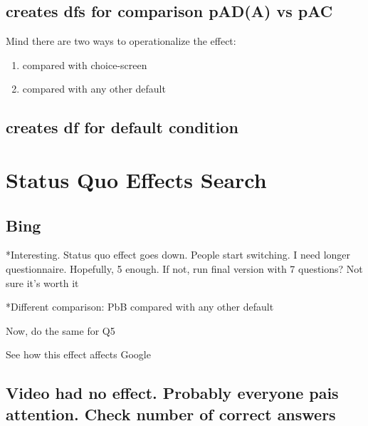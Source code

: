 \documentclass[
  11pt,
]{article}
\begin{document}
\hypertarget{creates-dfs-for-comparison-pada-vs-pac}{%
\subsection{creates dfs for comparison pA\textbar D(A) vs pA\textbar C}\label{creates-dfs-for-comparison-pada-vs-pac}}

Mind there are two ways to operationalize the effect:

\begin{enumerate}
\def\labelenumi{\arabic{enumi})}
\item
  compared with choice-screen
\item
  compared with any other default
\end{enumerate}

\hypertarget{creates-df-for-default-condition}{%
\subsection{creates df for default condition}\label{creates-df-for-default-condition}}

\hypertarget{status-quo-effects-search}{%
\section{Status Quo Effects Search}\label{status-quo-effects-search}}

\hypertarget{bing}{%
\subsection{Bing}\label{bing}}

*Interesting. Status quo effect goes down. People start switching. I need longer questionnaire. Hopefully, 5 enough. If not, run final version with 7 questions? Not sure it's worth it

*Different comparison: Pb\textbar B compared with any other default

Now, do the same for Q5

See how this effect affects Google

\hypertarget{video-had-no-effect.-probably-everyone-pais-attention.-check-number-of-correct-answers}{%
\subsection{Video had no effect. Probably everyone pais attention. Check number of correct answers}\label{video-had-no-effect.-probably-everyone-pais-attention.-check-number-of-correct-answers}}
\end{document}
